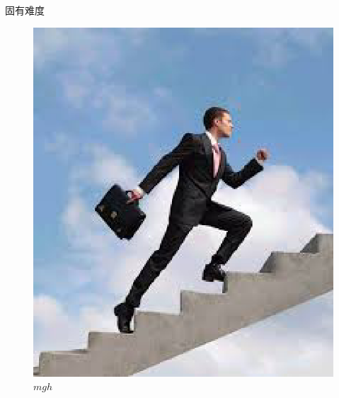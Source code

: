 \documentclass{beamer}
\begin{document}
\begin{frame}{固有难度}
\begin{figure}
\begin{minipage}{0.4\textwidth}
			\includegraphics[height=4\baselineskip]{figures/pl.eps}
		\end{minipage}
		\caption*{$mgh$}
	\end{figure}
\end{frame}
\end{document}
